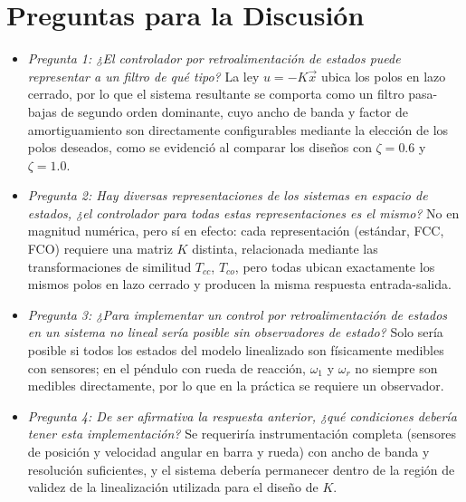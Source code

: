 \documentclass[conference]{IEEEtran}
\begin{document}
\section{Preguntas para la Discusión}

\begin{itemize}
    \item \textit{Pregunta 1: ¿El controlador por retroalimentación de estados puede representar a un filtro de qué tipo?} La ley $u=-K\vec{x}$ ubica los polos en lazo cerrado, por lo que el sistema resultante se comporta como un filtro pasa-bajas de segundo orden dominante, cuyo ancho de banda y factor de amortiguamiento son directamente configurables mediante la elección de los polos deseados, como se evidenció al comparar los diseños con $\zeta=0.6$ y $\zeta=1.0$.
    \item \textit{Pregunta 2: Hay diversas representaciones de los sistemas en espacio de estados, ¿el controlador para todas estas representaciones es el mismo?} No en magnitud numérica, pero sí en efecto: cada representación (estándar, FCC, FCO) requiere una matriz $K$ distinta, relacionada mediante las transformaciones de similitud $T_{cc}$, $T_{co}$, pero todas ubican exactamente los mismos polos en lazo cerrado y producen la misma respuesta entrada-salida.
    \item \textit{Pregunta 3: ¿Para implementar un control por retroalimentación de estados en un sistema no lineal sería posible sin observadores de estado?} Solo sería posible si todos los estados del modelo linealizado son físicamente medibles con sensores; en el péndulo con rueda de reacción, $\omega_1$ y $\omega_r$ no siempre son medibles directamente, por lo que en la práctica se requiere un observador.
    \item \textit{Pregunta 4: De ser afirmativa la respuesta anterior, ¿qué condiciones debería tener esta implementación?} Se requeriría instrumentación completa (sensores de posición y velocidad angular en barra y rueda) con ancho de banda y resolución suficientes, y el sistema debería permanecer dentro de la región de validez de la linealización utilizada para el diseño de $K$.
\end{itemize}
\end{document}
